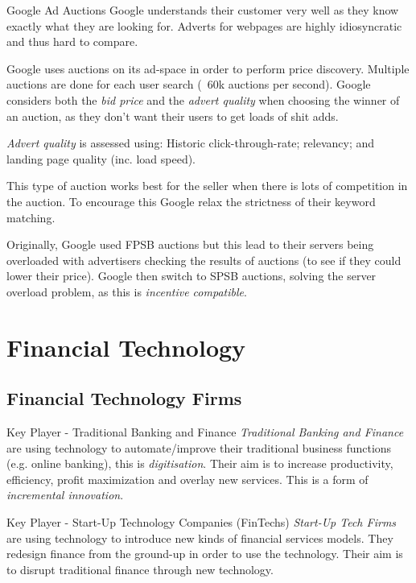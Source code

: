 \documentclass[11pt,a4paper]{article}
\begin{document}
  \begin{remark}{Google Ad Auctions}
    Google understands their customer very well as they know exactly what they are looking for. Adverts for webpages are highly idiosyncratic and thus hard to compare.
    \par Google uses auctions on its ad-space in order to perform price discovery. Multiple auctions are done for each user search (~60k auctions per second). Google considers both the \textit{bid price} and the \textit{advert quality} when choosing the winner of an auction, as they don't want their users to get loads of shit adds.
    \par \textit{Advert quality} is assessed using: Historic click-through-rate; relevancy; and landing page quality (inc. load speed).
    \par This type of auction works best for the seller when there is lots of competition in the auction. To encourage this Google relax the strictness of their keyword matching.
    \par Originally, Google used FPSB auctions but this lead to their servers being overloaded with advertisers checking the results of auctions (to see if they could lower their price). Google then switch to SPSB auctions, solving the server overload problem, as this is \textit{incentive compatible}.
  \end{remark}

\section{Financial Technology}

\subsection{Financial Technology Firms}

  \begin{proposition}{Key Player - Traditional Banking and Finance}
    \textit{Traditional Banking and Finance} are using technology to automate/improve their traditional business functions (e.g. online banking), this is \textit{digitisation}. Their aim is to increase productivity, efficiency, profit maximization and overlay new services. This is a form of \textit{incremental innovation}.
  \end{proposition}

  \begin{proposition}{Key Player - Start-Up Technology Companies (FinTechs)}
    \textit{Start-Up Tech Firms} are using technology to introduce new kinds of financial services models. They redesign finance from the ground-up in order to use the technology. Their aim is to disrupt traditional finance through new technology.
  \end{proposition}
\end{document}
